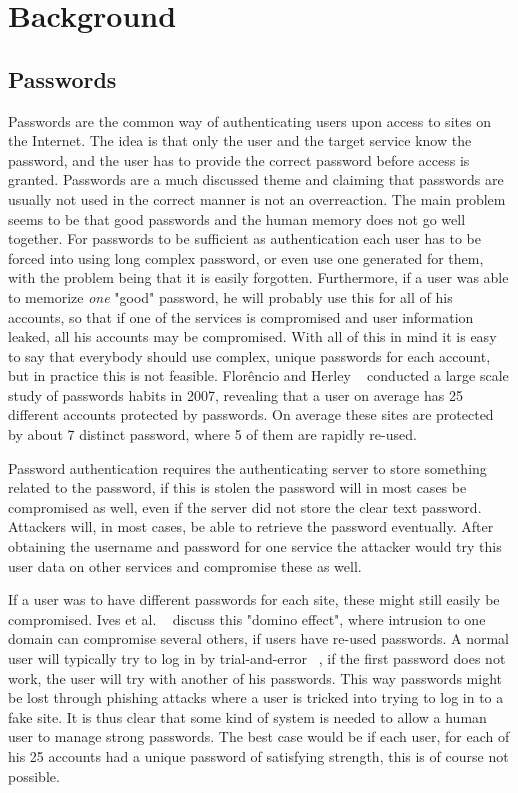 \chapter{Background}\label{chp:background}


\section{Passwords}
Passwords are the common way of authenticating users upon access to sites on the Internet. The idea is that only the user and the target service know the password, and the user has to provide the correct password before access is granted. Passwords are a much discussed theme and claiming that passwords are usually not used in the correct manner is not an overreaction. The main problem seems to be that good passwords and the human memory does not go well together. For passwords to be sufficient as authentication each user has to be forced into using long complex password, or even use one generated for them, with the problem being that it is easily forgotten. Furthermore, if a user was able to memorize \emph{one} "good" password, he will probably use this for all of his accounts, so that if one of the services is compromised and user information leaked, all his accounts may be compromised. With all of this in mind it is easy to say that everybody should use complex, unique passwords for each account, but in practice this is not feasible. Florêncio and Herley ~\cite{password-habits} conducted a large scale study of passwords habits in 2007, revealing that a user on average has 25 different accounts protected by passwords. On average these sites are protected by about 7 distinct password, where 5 of them are rapidly re-used.
\par Password authentication requires the authenticating server to store something related to the password, if this is stolen the password will in most cases be compromised as well, even if the server did not store the clear text password. Attackers will, in most cases, be able to retrieve the password eventually. After obtaining the username and password for one service the attacker would try this user data on other services and compromise these as well. 
\par If a user was to have different passwords for each site, these might still easily be compromised. Ives et al. ~\cite{domino-effect} discuss this "domino effect", where intrusion to one domain can compromise several others, if users have re-used passwords.  A normal user will typically try to log in by trial-and-error ~\cite{single-pw-auth}, if the first password does not work, the user will try with another of his passwords. This way passwords might be lost through phishing attacks where a user is tricked into trying to log in to a fake site. It is thus clear that some kind of system is needed to allow a human user to manage strong passwords. The best case would be if each user, for each of his 25 accounts had a unique password of satisfying strength, this is of course not possible.

